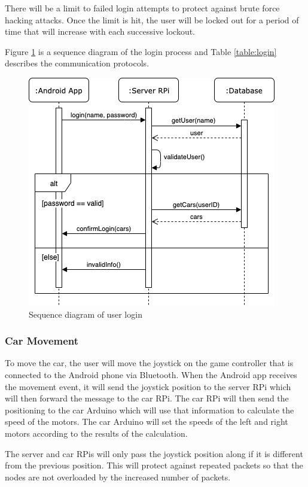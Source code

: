 \documentclass[letterpaper,12pt]{report}
\begin{document}
    There will be a limit to failed login attempts to protect against brute
    force hacking attacks. Once the limit is hit, the user will be locked out
    for a period of time that will increase with each successive lockout.

    Figure \ref{fig:login} is a sequence diagram of the login process and Table
    \ref{table:login} describes the communication protocols.

    \begin{figure}[H]
        \centering
        \includegraphics[width=0.7\linewidth]{diagrams/Design_Login_Sequence.png}
        \caption{Sequence diagram of user login}
        \label{fig:login}
    \end{figure}

    \subsubsection{Car Movement} \label{sssec:movement}

    To move the car, the user will move the joystick on the game controller
    that is connected to the Android phone via Bluetooth. When the Android
    app receives the movement event, it will send the joystick position to
    the server RPi which will then forward the message to the car RPi. The
    car RPi will then send the positioning to the car Arduino which will use
    that information to calculate the speed of the motors. The car Arduino
    will set the speeds of the left and right motors according to the results
    of the calculation.

    The server and car RPis will only pass the joystick position along if it
    is different from the previous position. This will protect against
    repeated packets so that the nodes are not overloaded by the increased
    number of packets.
\end{document}
